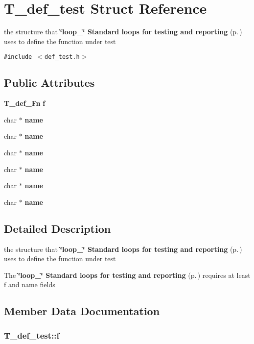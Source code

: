 \section{T\_\-def\_\-test Struct Reference}
\label{structT__def__test}
the structure that {\bf \char`\"{}loop\_\-\char`\"{} Standard loops for testing and reporting} {\rm (p.\,\pageref{group__loop__test})} uses to define the function under test 


{\tt \#include $<$def\_\-test.h$>$}

\subsection*{Public Attributes}
\begin{CompactItemize}
\item 
{\bf T\_\-def\_\-Fn} {\bf f}
\item 
char $\ast$ {\bf name}
\item 
char $\ast$ {\bf name}
\item 
char $\ast$ {\bf name}
\item 
char $\ast$ {\bf name}
\item 
char $\ast$ {\bf name}
\item 
char $\ast$ {\bf name}
\end{CompactItemize}


\subsection{Detailed Description}
the structure that {\bf \char`\"{}loop\_\-\char`\"{} Standard loops for testing and reporting} {\rm (p.\,\pageref{group__loop__test})} uses to define the function under test

The {\bf \char`\"{}loop\_\-\char`\"{} Standard loops for testing and reporting} {\rm (p.\,\pageref{group__loop__test})} requires at least f and name fields 



\subsection{Member Data Documentation}
\subsubsection{ T\_\-def\_\-test::f}\label{structT__def__test_m0}


